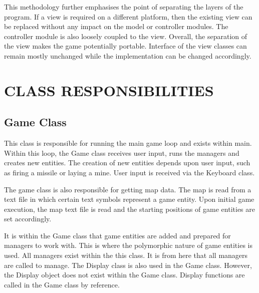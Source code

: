 \documentclass[10pt,twocolumn]{witseiepaper}
\begin{document}
This methodology further emphasises the point of separating the layers of the program. If a view is required on a different platform, then the existing view can be replaced without any impact on the model or controller modules. The controller module is also loosely coupled to the view. Overall, the separation of the view makes the game potentially portable. Interface of the view classes can remain mostly unchanged while the implementation can be changed accordingly.

%
\section{CLASS RESPONSIBILITIES} %



\subsection{Game Class} 
This class is responsible for running the main game loop and exists within main. Within this loop, the Game class receives user input, runs the managers and creates new entities. The creation of new entities depends upon user input, such as firing a missile or laying a mine. User input is received via the Keyboard class.

The game class is also responsible for getting map data. The map is read from a text file in which certain text symbols represent a game entity. Upon initial game execution, the map text file is read and the starting positions of game entities are set accordingly. 

It is within the Game class that game entities are added and prepared for managers to work with. This is where the polymorphic nature of game entities is used. All managers exist within the this class. It is from here that all managers are called to manage. The Display class is also used in the Game class. However, the Display object does not exist within the Game class. Display functions are called in the Game class by reference. 
\end{document}
